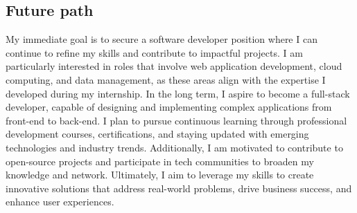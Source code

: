 \subsection{Future path}
My immediate goal is to secure a software developer position where I can continue to refine my skills and contribute to impactful projects. I am particularly interested in roles that involve web application development, cloud computing, and data management, as these areas align with the expertise I developed during my internship. In the long term, I aspire to become a full-stack developer, capable of designing and implementing complex applications from front-end to back-end. I plan to pursue continuous learning through professional development courses, certifications, and staying updated with emerging technologies and industry trends. Additionally, I am motivated to contribute to open-source projects and participate in tech communities to broaden my knowledge and network. Ultimately, I aim to leverage my skills to create innovative solutions that address real-world problems, drive business success, and enhance user experiences.




